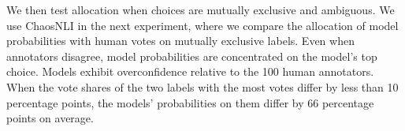 

We then test allocation when choices are mutually exclusive and ambiguous. We use ChaosNLI \citep{nie2020chaosnli} in the next experiment, where we compare the allocation of model probabilities with human votes on mutually exclusive labels. Even when annotators disagree, model probabilities are concentrated on the model's top choice. Models exhibit overconfidence relative to the 100 human annotators. When the vote shares of the two labels with the most votes differ by less than 10 percentage points, the models' probabilities on them differ by 66 percentage points on average.
